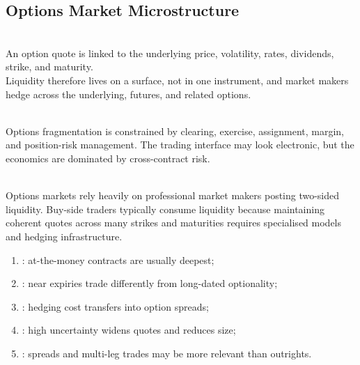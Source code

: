 \subsection{Options Market Microstructure}

\begin{principle} \\
An option quote is linked to the underlying price, volatility, rates, dividends, strike, and maturity.\\
Liquidity therefore lives on a surface, not in one instrument, and market makers hedge across the underlying, futures, and related options.
\end{principle}

\begin{caveat} \\
Options fragmentation is constrained by clearing, exercise, assignment, margin, and position-risk management. The trading interface may look electronic, but the economics are dominated by cross-contract risk.
\end{caveat}

\begin{mechanism} \\
Options markets rely heavily on professional market makers posting two-sided liquidity. Buy-side traders typically consume liquidity because maintaining coherent quotes across many strikes and maturities requires specialised models and hedging infrastructure.
\end{mechanism}

\begin{taxonomy} 
\begin{enumerate}[label=\roman*.]
\setlength{\itemsep}{0pt}
\item {}: at-the-money contracts are usually deepest;
\item {}: near expiries trade differently from long-dated optionality;
\item {}: hedging cost transfers into option spreads;
\item {}: high uncertainty widens quotes and reduces size;
\item {}: spreads and multi-leg trades may be more relevant than outrights.
\end{enumerate}
\end{taxonomy}
